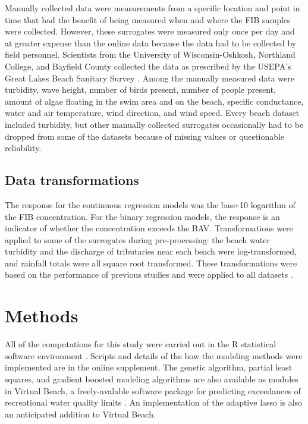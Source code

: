 \documentclass[authoryear,review, 12pt]{elsarticle}
\begin{document}
Manually collected data were measurements from a specific location and point in time that had the
benefit of being measured when and where the FIB samples were collected.
However, these surrogates were measured only once per day and at greater
expense than the online data because the data had to be collected by
field personnel. Scientists from the University of Wisconsin-Oshkosh, Northland College, and Bayfield County collected the data as prescribed by the
USEPA's Great Lakes Beach Sanitary Survey \citep{USEPA:2008ib}. Among the
manually measured data were turbidity, wave height, number of birds
present, number of people present, amount of algae floating in the swim
area and on the beach, specific conductance, water and air temperature,
wind direction, and wind speed. Every beach dataset included turbidity,
but other manually collected surrogates occasionally had to be dropped from some of
the datasets because of missing values or questionable reliability.

\subsection{Data transformations}\label{data-transformations}

The response for the continuous regression models was the base-10
logarithm of the FIB concentration. For the binary regression models,
the response is an indicator of whether the concentration exceeds the
BAV. Transformations were applied to some of the surrogates during
pre-processing: the beach water turbidity and the discharge of
tributaries near each beach were log-transformed, and rainfall
totals were all square root transformed. These transformations were
based on the performance of previous studies and were applied to all
datasets \citep{Ge:2007ou,Frick:2008jo}.

\section{Methods}\label{methods}

All of the computations for this study were carried
out in the R statistical software environment \citep{R-2014}. Scripts and
details of the how the modeling methods were implemented are in the
online supplement. The genetic algorithm, partial least squares, and gradient boosted modeling algorithms are also available as modules in Virtual Beach, a freely-avalable software package for predicting exceedances of recreational water quality limits \citep{VB3-2013}. An implementation of
the adaptive lasso is also an anticipated addition to Virtual Beach.
\end{document}
